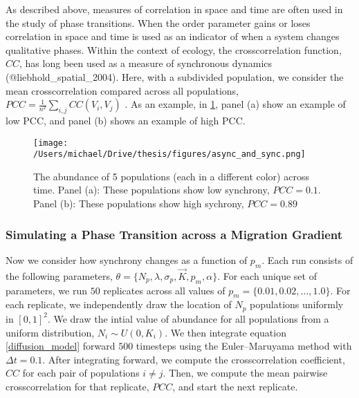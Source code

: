 As described above, measures of correlation in space and time are often
used in the study of phase transitions. When the order parameter gains
or loses correlation in space and time is used as an indicator of when a
system changes qualitative phases. Within the context of ecology, the
crosscorrelation function, \(CC\), has long been used as a measure of
synchronous dynamics (@liebhold\_spatial\_2004). Here, with a subdivided
population, we consider the mean crosscorrelation compared across all
populations, \({PCC}=\frac{1}{n^2}\sum_{i,j} CC(V_i,V_j)\) . As an
example, in \ref{async_and_sync}, panel (a) show an example of low PCC,
and panel (b) shows an example of high PCC.

\begin{figure}[h]

\texttt{[image: /Users/michael/Drive/thesis/figures/async\_and\_sync.png]}

\caption{The abundance of 5 populations (each in a different color) across time. Panel (a):  These populations show low synchrony, $PCC=0.1$. Panel (b): These populations show high sychrony, $PCC=0.89$ }

\label{async_and_sync}

\end{figure}

\hypertarget{simulating-a-phase-transition-across-a-migration-gradient}{%
\subsubsection{Simulating a Phase Transition across a Migration
Gradient}\label{simulating-a-phase-transition-across-a-migration-gradient}}

Now we consider how synchrony changes as a function of \(p_m\). Each run
consists of the following parameters,
\(\theta = \{N_p, \lambda, \sigma_p, \vec{K},p_m, \alpha \}\). For each
unique set of parameters, we run \(50\) replicates across all values of
\(p_m = \{0.01,0.02,\dots,1.0 \}\). For each replicate, we independently
draw the location of \(N_p\) populations uniformly in \([0,1]^2\). We
draw the intial value of abundance for all populations from a uniform
distribution, \(N_i \sim U(0, K_i)\). We then integrate equation
\ref{diffusion_model} forward \(500\) timesteps using the
Euler--Maruyama method with \(\Delta t=0.1\). After integrating forward,
we compute the crosscorrelation coefficient, \(CC\) for each pair of
populations \(i \neq j\). Then, we compute the mean pairwise
crosscorrelation for that replicate, \(PCC\), and start the next
replicate.

